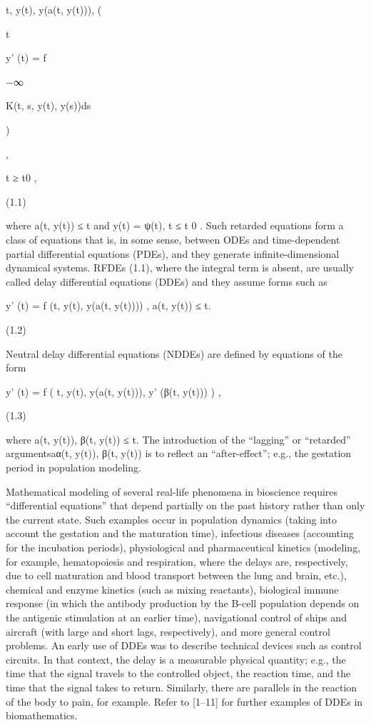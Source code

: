 \documentclass[12pt]{article}
\begin{document}
t, y(t), y(a(t, y(t))), (

t

y' (t) = f

 −∞

K(t, s, y(t), y(s))ds

)

,

t ≥ t0 ,

(1.1)

where a(t, y(t)) ≤ t and y(t) = ψ(t), t ≤ t 0 . Such retarded equations form a class of equations that is, in some sense, between ODEs and 
time-dependent partial differential equations (PDEs), and they generate infinite-dimensional dynamical systems. RFDEs (1.1), where the 
integral term is absent, are usually called delay differential equations (DDEs) and they assume forms such as

y' (t) = f (t, y(t), y(a(t, y(t)))) , a(t, y(t)) ≤ t.

(1.2)

Neutral delay differential equations (NDDEs) are defined by equations of the form

y' (t) = f ( t, y(t), y(a(t, y(t))), y' (β(t, y(t))) ) ,

(1.3)

where a(t, y(t)), β(t, y(t)) ≤ t. The introduction of the “lagging” or “retarded” argumentsaα(t, y(t)), β(t, y(t)) is to reﬂect an 
“after-effect”; e.g., the gestation period in population modeling.

Mathematical modeling of several real-life phenomena in bioscience requires “differential equations” that depend partially on the past 
history rather than only the current state. Such examples occur in population dynamics (taking into account the gestation and the maturation 
time), infectious diseases (accounting for the incubation periods), physiological and pharmaceutical kinetics (modeling, for example, 
hematopoiesis and respiration, where the delays are, respectively, due to cell maturation and blood transport between the lung and brain, 
etc.), chemical and enzyme kinetics (such as mixing reactants), biological immune response (in which the antibody production by the B-cell 
population depends on the antigenic stimulation at an earlier time), navigational control of ships and aircraft (with large and short lags, 
respectively), and more general control problems. An early use of DDEs was to describe technical devices such as control circuits. In that 
context, the delay is a measurable physical quantity; e.g., the time that the signal travels to the controlled object, the reaction time, and 
the time that the signal takes to return. Similarly, there are parallels in the reaction of the body to pain, for example. Refer to [1–11] 
for further examples of DDEs in biomathematics.
\end{document}
